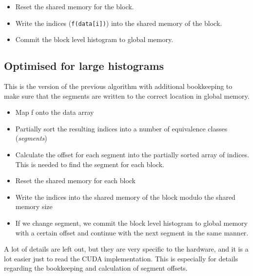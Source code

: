\documentclass[12pt, a4paper, hidelinks]{article}
\renewcommand{\tt}[1]{\texttt{#1}}
\renewcommand{\it}[1]{\textit{#1}}
\begin{document}
\begin{itemize}
\item Reset the shared memory for the block.
\item Write the indices (\tt{f(data[i])}) into the shared memory of the block.
\item Commit the block level histogram to global memory.
\end{itemize}

\subsection{Optimised for large histograms}
This is the version of the previous algorithm with additional bookkeeping
to make sure that the segments are written to the correct location in global memory.

\begin{itemize}
\item
  Map f onto the data array
\item
  Partially sort the resulting indices into a number of equivalence classes (\it{segments})
\item
  Calculate the offset for each segment into
  the partially sorted array of indices.
  This is needed to find the segment for each block.
\item
  Reset the shared memory for each block
\item
  Write the indices into the shared memory of the block modulo the shared memory size
\item
  If we change segment,
  we commit the block level histogram to global memory with a certain
  offset and continue with the next segment in the same manner.
\end{itemize}

A lot of details are left out, but they are very specific to the hardware,
and it is a lot easier just to read the CUDA implementation.
This is especially for details regarding the bookkeeping and calculation
of segment offsets.
\end{document}
